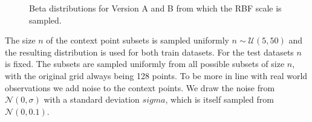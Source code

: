 \begin{figure}
	\centering
	\resizebox{0.4\textwidth}{!}{
	
	}
	\caption{Beta distributions for Version A and B from which the RBF scale is sampled.}
	\label{fig:beta_scales}
\end{figure}

The size $n$ of the context point subsets is sampled uniformly $n\sim \mathcal{U}(5,50)$ and the resulting distribution is used for both train datasets.  For the test datasets $n$ is fixed. The subsets are sampled uniformly from all possible subsets of size $n$, with the original grid always being 128 points. To be more in line with real world observations we add noise to the context points. We draw the noise from $\mathcal{N}(0,\sigma)$ with a standard deviation $sigma$, which is itself sampled from $\mathcal{N}(0,0.1)$.